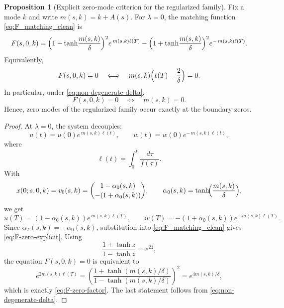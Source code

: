 \documentclass[11pt]{article}
\theoremstyle{definition}
\newtheorem{proposition}[theorem]{Proposition}
\numberwithin{equation}{section}
\begin{document}
\begin{proposition}[Explicit zero-mode criterion for the regularized family]
\label{prop:explicit-zero-mode-criterion}
Fix a mode \(k\) and write \(m(s,k)=k+A(s)\). For \(\lambda=0\), the matching function \eqref{eq:F_matching_clean} is
\begin{equation}\label{eq:F-zero-explicit}
F(s,0,k)
=
\Bigl(1-\tanh\!\frac{m(s,k)}{\delta}\Bigr)^2 e^{\,m(s,k)\ell(T)}
-
\Bigl(1+\tanh\!\frac{m(s,k)}{\delta}\Bigr)^2 e^{-\,m(s,k)\ell(T)}.
\end{equation}
Equivalently,
\begin{equation}\label{eq:F-zero-factor}
F(s,0,k)=0
\quad\Longleftrightarrow\quad
m(s,k)\Bigl(\ell(T)-\frac{2}{\delta}\Bigr)=0.
\end{equation}
In particular, under \eqref{eq:non-degenerate-delta},
\begin{equation}
F(s,0,k)=0
\quad\Longleftrightarrow\quad
m(s,k)=0.
\end{equation}
Hence, zero modes of the regularized family occur exactly at the boundary zeros.
\end{proposition}

\begin{proof}
At \(\lambda=0\), the system decouples:
\begin{equation}
u(t)=u(0)e^{\,m(s,k)\ell(t)},
\qquad
w(t)=w(0)e^{-\,m(s,k)\ell(t)},
\end{equation}
where
\begin{equation}
\ell(t)=\int_0^t \frac{d\tau}{f(\tau)}.
\end{equation}
With
\begin{equation}
x(0;s,0,k)=v_0(s,k)
=
\binom{1-\alpha_0(s,k)}{-(1+\alpha_0(s,k))},
\qquad
\alpha_0(s,k)=\tanh\!\Bigl(\frac{m(s,k)}{\delta}\Bigr),
\end{equation}
we get
\begin{equation}
u(T)=(1-\alpha_0(s,k))e^{\,m(s,k)\ell(T)},
\qquad
w(T)=-(1+\alpha_0(s,k))e^{-\,m(s,k)\ell(T)}.
\end{equation}
Since \(\alpha_T(s,k)=-\alpha_0(s,k)\), substitution into \eqref{eq:F_matching_clean} gives \eqref{eq:F-zero-explicit}. Using
\begin{equation}
\frac{1+\tanh z}{1-\tanh z}=e^{2z},
\end{equation}
the equation \(F(s,0,k)=0\) is equivalent to
\begin{equation}
e^{2m(s,k)\ell(T)}
=
\left(\frac{1+\tanh(m(s,k)/\delta)}{1-\tanh(m(s,k)/\delta)}\right)^2
=
e^{4m(s,k)/\delta},
\end{equation}
which is exactly \eqref{eq:F-zero-factor}. The last statement follows from \eqref{eq:non-degenerate-delta}.
\end{proof}
\end{document}
